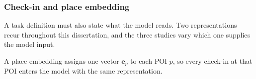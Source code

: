 \subsubsection{Check-in and place embedding}

A task definition must also state what the model reads. Two representations recur
throughout this dissertation, and the three studies vary which one supplies the model
input.

\begin{definition}\label{def:fund:placelevel}
A place embedding assigns one vector $\mathbf{e}_p$ to each POI $p$, so every check-in
at that POI enters the model with the same representation.
\end{definition}

